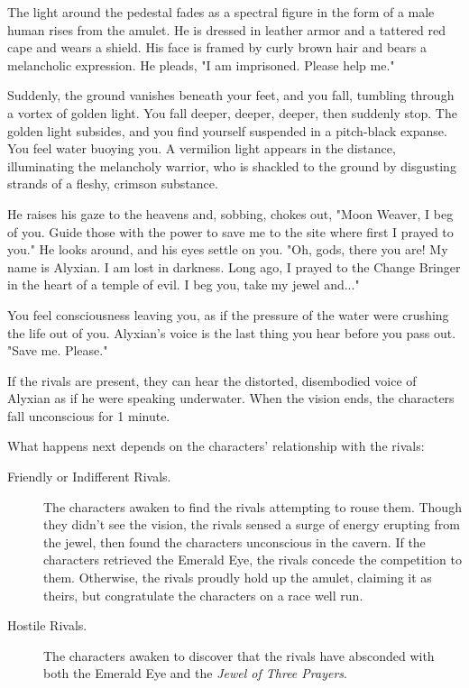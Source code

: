 \documentclass[10pt,a4paper,twoside,fancy,bg=print,twocolumn,openany,nodeprecatedcode]{dndbook}
\begin{document}
\begin{DndReadAloud}{}
The light around the pedestal fades as a spectral figure in the form of a male human rises from the amulet. He is dressed in leather armor and a tattered red cape and wears a shield. His face is framed by curly brown hair and bears a melancholic expression. He pleads, "I am imprisoned. Please help me."

Suddenly, the ground vanishes beneath your feet, and you fall, tumbling through a vortex of golden light. You fall deeper, deeper, deeper, then suddenly stop. The golden light subsides, and you find yourself suspended in a pitch-black expanse. You feel water buoying you. A vermilion light appears in the distance, illuminating the melancholy warrior, who is shackled to the ground by disgusting strands of a fleshy, crimson substance.

He raises his gaze to the heavens and, sobbing, chokes out, "Moon Weaver, I beg of you. Guide those with the power to save me to the site where first I prayed to you." He looks around, and his eyes settle on you. "Oh, gods, there you are! My name is Alyxian. I am lost in darkness. Long ago, I prayed to the Change Bringer in the heart of a temple of evil. I beg you, take my jewel and..."

You feel consciousness leaving you, as if the pressure of the water were crushing the life out of you. Alyxian's voice is the last thing you hear before you pass out. "Save me. Please."

\end{DndReadAloud}

If the rivals are present, they can hear the distorted, disembodied voice of Alyxian as if he were speaking underwater. When the vision ends, the characters fall unconscious for 1 minute.

What happens next depends on the characters' relationship with the rivals:


\begin{description}
\item[Friendly or Indifferent Rivals.]
The characters awaken to find the rivals attempting to rouse them. Though they didn't see the vision, the rivals sensed a surge of energy erupting from the jewel, then found the characters unconscious in the cavern. If the characters retrieved the Emerald Eye, the rivals concede the competition to them. Otherwise, the rivals proudly hold up the amulet, claiming it as theirs, but congratulate the characters on a race well run.
\item[Hostile Rivals.]
The characters awaken to discover that the rivals have absconded with both the Emerald Eye and the \textit{Jewel of Three Prayers}.
\end{description}
\end{document}
